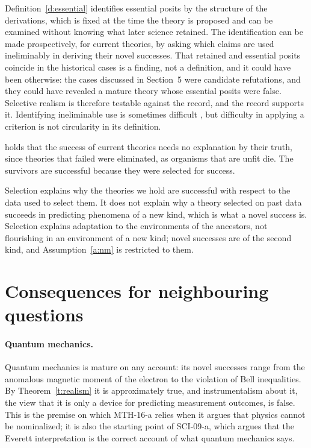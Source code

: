 \documentclass{situationist-preprint}
\begin{document}
\begin{reply}
Definition~\ref{d:essential} identifies essential posits by the structure of the derivations, which is fixed at the time the theory is proposed and can be examined without knowing what later science retained. The identification can be made prospectively, for current theories, by asking which claims are used ineliminably in deriving their novel successes. That retained and essential posits coincide in the historical cases is a finding, not a definition, and it could have been otherwise: the cases discussed in Section~5 were candidate refutations, and they could have revealed a mature theory whose essential posits were false. Selective realism is therefore testable against the record, and the record supports it. Identifying ineliminable use is sometimes difficult \citep{Vickers2013}, but difficulty in applying a criterion is not circularity in its definition.
\end{reply}

\begin{objection}
\citet{vanFraassen1980} holds that the success of current theories needs no explanation by their truth, since theories that failed were eliminated, as organisms that are unfit die. The survivors are successful because they were selected for success.
\end{objection}

\begin{reply}
Selection explains why the theories we hold are successful with respect to the data used to select them. It does not explain why a theory selected on past data succeeds in predicting phenomena of a new kind, which is what a novel success is. Selection explains adaptation to the environments of the ancestors, not flourishing in an environment of a new kind; novel successes are of the second kind, and Assumption~\ref{a:nm} is restricted to them.
\end{reply}


\section{Consequences for neighbouring questions}

\paragraph{Quantum mechanics.} Quantum mechanics is mature on any account: its novel successes range from the anomalous magnetic moment of the electron to the violation of Bell inequalities. By Theorem~\ref{t:realism} it is approximately true, and instrumentalism about it, the view that it is only a device for predicting measurement outcomes, is false. This is the premise on which MTH-16-a relies when it argues that physics cannot be nominalized; it is also the starting point of SCI-09-a, which argues that the Everett interpretation is the correct account of what quantum mechanics says.
\end{document}

